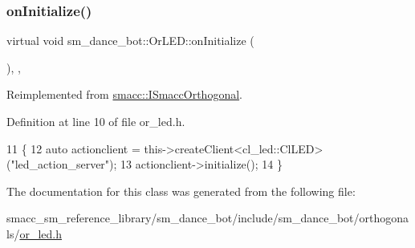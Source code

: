 \subsubsection{\texorpdfstring{on\+Initialize()}{onInitialize()}}
{\footnotesize\ttfamily virtual void sm\+\_\+dance\+\_\+bot\+::\+Or\+L\+E\+D\+::on\+Initialize (\begin{DoxyParamCaption}{ }\end{DoxyParamCaption})\hspace{0.3cm}{\ttfamily [inline]}, {\ttfamily [override]}, {\ttfamily [virtual]}}



Reimplemented from \hyperlink{classsmacc_1_1ISmaccOrthogonal_a6bb31c620cb64dd7b8417f8705c79c7a}{smacc\+::\+I\+Smacc\+Orthogonal}.



Definition at line 10 of file or\+\_\+led.\+h.


\begin{DoxyCode}
11     \{
12         \textcolor{keyword}{auto} actionclient = this->createClient<cl\_led::ClLED>(\textcolor{stringliteral}{"led\_action\_server"});
13         actionclient->initialize();
14     \}
\end{DoxyCode}


The documentation for this class was generated from the following file\+:\begin{DoxyCompactItemize}
\item 
smacc\+\_\+sm\+\_\+reference\+\_\+library/sm\+\_\+dance\+\_\+bot/include/sm\+\_\+dance\+\_\+bot/orthogonals/\hyperlink{sm__dance__bot_2include_2sm__dance__bot_2orthogonals_2or__led_8h}{or\+\_\+led.\+h}\end{DoxyCompactItemize}
